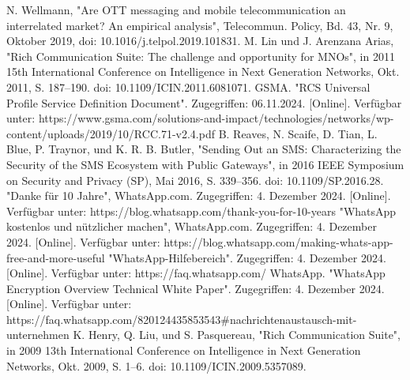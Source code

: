 \documentclass[conference]{IEEEtran}
\begin{document}
\begin{thebibliography}{00}
     N. Wellmann, "Are OTT messaging and mobile telecommunication an interrelated market? An empirical analysis", Telecommun. Policy, Bd. 43, Nr. 9, Oktober 2019, doi: 10.1016/j.telpol.2019.101831.
     M. Lin und J. Arenzana Arias, "Rich Communication Suite: The challenge and opportunity for MNOs", in 2011 15th International Conference on Intelligence in Next Generation Networks, Okt. 2011, S. 187–190. doi: 10.1109/ICIN.2011.6081071.
     GSMA. "RCS Universal Profile Service Definition Document". Zugegriffen: 06.11.2024. [Online]. Verfügbar unter: https://www.gsma.com/solutions-and-impact/technologies/networks/wp-content/uploads/2019/10/RCC.71-v2.4.pdf
     B. Reaves, N. Scaife, D. Tian, L. Blue, P. Traynor, und K. R. B. Butler, "Sending Out an SMS: Characterizing the Security of the SMS Ecosystem with Public Gateways", in 2016 IEEE Symposium on Security and Privacy (SP), Mai 2016, S. 339–356. doi: 10.1109/SP.2016.28.
     "Danke für 10 Jahre", WhatsApp.com. Zugegriffen: 4. Dezember 2024. [Online]. Verfügbar unter: https://blog.whatsapp.com/thank-you-for-10-years
     "WhatsApp kostenlos und nützlicher machen", WhatsApp.com. Zugegriffen: 4. Dezember 2024. [Online]. Verfügbar unter: https://blog.whatsapp.com/making-whats-app-free-and-more-useful
     "WhatsApp-Hilfebereich". Zugegriffen: 4. Dezember 2024. [Online]. Verfügbar unter: https://faq.whatsapp.com/
     WhatsApp. "WhatsApp Encryption Overview Technical White Paper". Zugegriffen: 4. Dezember 2024. [Online]. Verfügbar unter: https://faq.whatsapp.com/820124435853543\#nachrichtenaustausch-mit-unternehmen
     K. Henry, Q. Liu, und S. Pasquereau, "Rich Communication Suite", in 2009 13th International Conference on Intelligence in Next Generation Networks, Okt. 2009, S. 1–6. doi: 10.1109/ICIN.2009.5357089.
\end{thebibliography}
\end{document}
